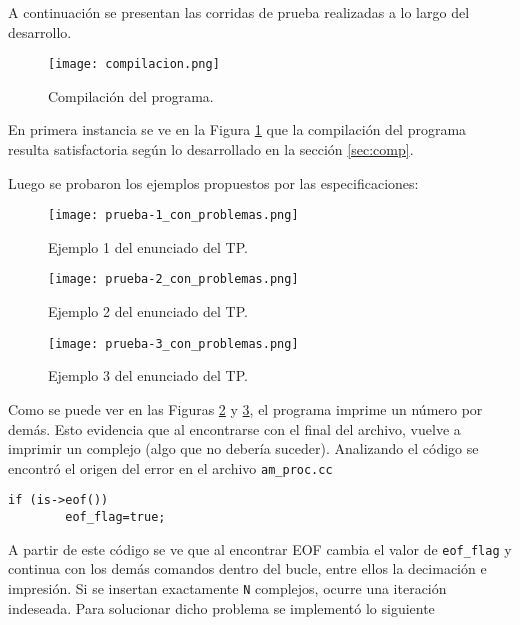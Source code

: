 
A continuación se presentan las corridas de prueba realizadas a lo largo del desarrollo. \\

\begin{figure}[H]
	\centering
		\texttt{[image: compilacion.png]}
	\caption{Compilación del programa.}
	\label{fig:corrida_makefile}
\end{figure}

En primera instancia se ve en la Figura \ref{fig:corrida_makefile} que la compilación del programa resulta satisfactoria según lo desarrollado en la sección \ref{sec:comp}.

Luego se probaron los ejemplos propuestos por las especificaciones:

\begin{figure}[H]
	\centering
		\texttt{[image: prueba-1\_con\_problemas.png]}
	\caption{Ejemplo 1 del enunciado del TP.}
	\label{fig:prueba1_con_prob}
\end{figure}


\begin{figure}[H]
	\centering
		\texttt{[image: prueba-2\_con\_problemas.png]}
	\caption{Ejemplo 2 del enunciado del TP.}
	\label{fig:prueba2_con_prob}
\end{figure}

\begin{figure}[H]
	\centering
		\texttt{[image: prueba-3\_con\_problemas.png]}
	\caption{Ejemplo 3 del enunciado del TP.}
	\label{fig:prueba3_con_prob}
\end{figure}

Como se puede ver en las Figuras \ref{fig:prueba1_con_prob} y \ref{fig:prueba2_con_prob}, el programa imprime un número por demás. Esto evidencia que al encontrarse con el final del archivo, vuelve a imprimir un complejo (algo que no debería suceder). Analizando el código se encontró el origen del error en el archivo \texttt{am\_proc.cc}

\begin{lstlisting}[firstnumber=100]
	if (is->eof())
		eof_flag=true;
\end{lstlisting}

A partir de este código se ve que al encontrar EOF cambia el valor de \texttt{eof\_flag} y continua con los demás comandos dentro del bucle, entre ellos la decimación e impresión. Si se insertan exactamente \texttt{N} complejos, ocurre una iteración indeseada. Para solucionar dicho problema se implementó lo siguiente

